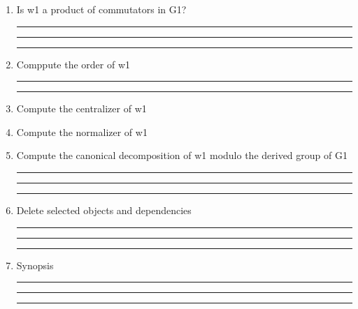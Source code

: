 \begin{enumerate}
\item Is w1 a product of commutators in G1?


\bigskip
\hrule\hrule\hrule

\item Comppute the order of w1

\bigskip
\hrule\hrule

\item Compute the centralizer of w1

\item Compute the normalizer of w1

\item Compute the canonical decomposition of w1 modulo the derived
group of G1

\bigskip
\hrule\hrule\hrule

\item Delete selected objects and dependencies

\bigskip
\hrule\hrule\hrule

\item
Synopsis

\bigskip
\hrule\hrule\hrule

\end{enumerate}

